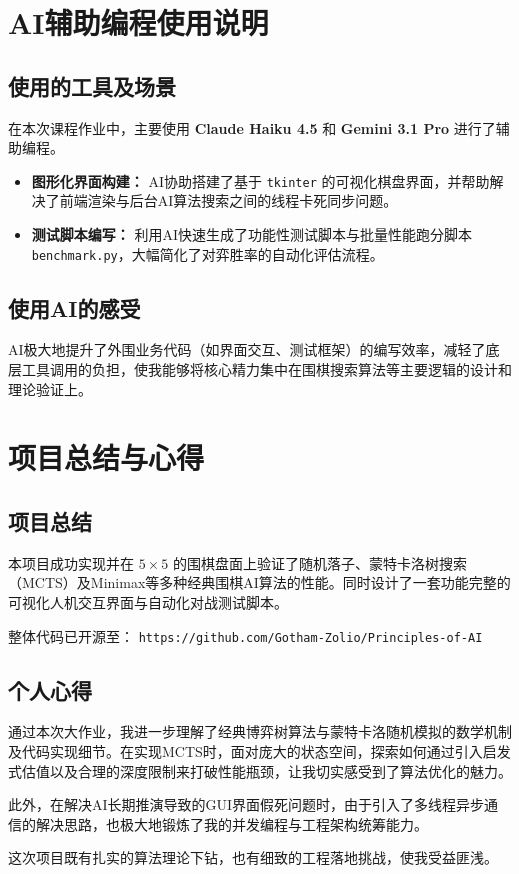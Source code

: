 \documentclass[12pt,a4paper]{ctexart}
\begin{document}
\section{AI辅助编程使用说明}
\subsection{使用的工具及场景}
在本次课程作业中，主要使用 \textbf{Claude Haiku 4.5} 和 \textbf{Gemini 3.1 Pro} 进行了辅助编程。
\begin{itemize}
    \item \textbf{图形化界面构建：} AI协助搭建了基于 \texttt{tkinter} 的可视化棋盘界面，并帮助解决了前端渲染与后台AI算法搜索之间的线程卡死同步问题。
    \item \textbf{测试脚本编写：} 利用AI快速生成了功能性测试脚本与批量性能跑分脚本 \texttt{benchmark.py}，大幅简化了对弈胜率的自动化评估流程。
\end{itemize}

\subsection{使用AI的感受}
AI极大地提升了外围业务代码（如界面交互、测试框架）的编写效率，减轻了底层工具调用的负担，使我能够将核心精力集中在围棋搜索算法等主要逻辑的设计和理论验证上。

\section{项目总结与心得}
\subsection{项目总结}
本项目成功实现并在 $5\times 5$ 的围棋盘面上验证了随机落子、蒙特卡洛树搜索（MCTS）及Minimax等多种经典围棋AI算法的性能。同时设计了一套功能完整的可视化人机交互界面与自动化对战测试脚本。

整体代码已开源至：
\texttt{https://github.com/Gotham-Zolio/Principles-of-AI}

\subsection{个人心得}
通过本次大作业，我进一步理解了经典博弈树算法与蒙特卡洛随机模拟的数学机制及代码实现细节。在实现MCTS时，面对庞大的状态空间，探索如何通过引入启发式估值以及合理的深度限制来打破性能瓶颈，让我切实感受到了算法优化的魅力。

此外，在解决AI长期推演导致的GUI界面假死问题时，由于引入了多线程异步通信的解决思路，也极大地锻炼了我的并发编程与工程架构统筹能力。

这次项目既有扎实的算法理论下钻，也有细致的工程落地挑战，使我受益匪浅。
\end{document}

